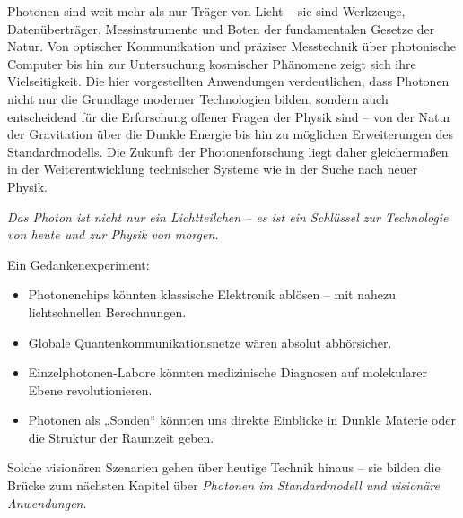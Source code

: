 Photonen sind weit mehr als nur Träger von Licht – sie sind Werkzeuge, Datenüberträger, Messinstrumente und Boten der fundamentalen Gesetze der Natur. 
Von optischer Kommunikation und präziser Messtechnik über photonische Computer bis hin zur Untersuchung kosmischer Phänomene zeigt sich ihre Vielseitigkeit. 
Die hier vorgestellten Anwendungen verdeutlichen, dass Photonen nicht nur die Grundlage moderner Technologien bilden, sondern auch entscheidend für die Erforschung offener Fragen der Physik sind – von der Natur der Gravitation über die Dunkle Energie bis hin zu möglichen Erweiterungen des Standardmodells. 
Die Zukunft der Photonenforschung liegt daher gleichermaßen in der Weiterentwicklung technischer Systeme wie in der Suche nach neuer Physik.

\medskip
\emph{Das Photon ist nicht nur ein Lichtteilchen – es ist ein Schlüssel zur Technologie von heute und zur Physik von morgen.}
\medskip
\begin{tcolorbox}[hypobox, title={Was wäre, wenn wir Photonen völlig kontrollieren könnten?}]
	\label{box:hypo_kapVII}
	Ein Gedankenexperiment: 
	\begin{itemize}
		\item Photonenchips könnten klassische Elektronik ablösen – mit nahezu lichtschnellen Berechnungen.
		\item Globale Quantenkommunikationsnetze wären absolut abhörsicher.
		\item Einzelphotonen-Labore könnten medizinische Diagnosen auf molekularer Ebene revolutionieren.
		\item Photonen als „Sonden“ könnten uns direkte Einblicke in Dunkle Materie oder die Struktur der Raumzeit geben.
	\end{itemize}
	\medskip
	Solche visionären Szenarien gehen über heutige Technik hinaus – sie bilden die Brücke zum nächsten Kapitel über \emph{Photonen im Standardmodell und visionäre Anwendungen}.
\end{tcolorbox}

